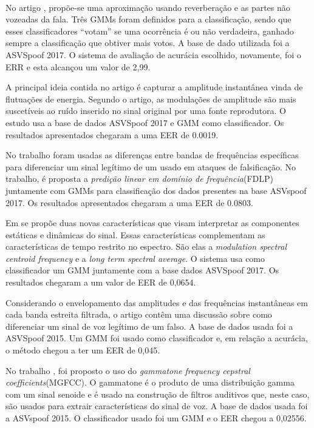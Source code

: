 \documentclass[a4paper,12pt,openright,oneside]{book}
\newenvironment{myenv}[1]
{\begin{spacing}{#1}}
	{\end{spacing}}
\begin{document}
\begin{myenv}{1.5}
\\
\par No artigo \cite{ISI:000490497200068}, propõe-se uma aproximação usando reverberação e as partes não vozeadas da fala. Três GMMs foram definidos para a classificação, sendo que esses classificadores ``votam'' se uma ocorrência é ou não verdadeira, ganhado sempre a classificação que obtiver mais votos. A base de dado utilizada foi a ASVSpoof 2017. O sistema de avaliação de acurácia escolhido, novamente, foi o ERR e esta alcançou um valor de 2,99.
\\
\par A principal ideia contida no artigo \cite{ISI:000465363900136} é capturar a amplitude instantânea vinda de flutuações de energia. Segundo o artigo, as modulações de amplitude são mais suscetíveis ao ruído inserido no sinal original por uma fonte reprodutora. O estudo usa a base de dados ASVSpoof 2017 e GMM como classificador. Os resultados apresentados chegaram a uma EER de 0.0019.
\\
\par No trabalho \cite{ISI:000465363900139} foram usadas as diferenças entre bandas de frequências específicas para diferenciar um sinal legítimo de um usado em ataques de falsificação. No trabalho, é proposta a \textit{predição linear em domínio de frequência}(FDLP) juntamente com GMMs para classificação dos dados presentes na base ASVspoof  2017. Os resultados apresentados chegaram a uma EER de 0.0803.
\\
\par Em \cite{Suthokumar2018} se propõe duas novas características que visam interpretar as componentes estáticas e dinâmicas do sinal. Essas características complementam as características de tempo restrito no espectro. São elas a \textit{modulation  spectral  centroid  frequency} e a \textit{long term spectral average}. O sistema usa como classificador um GMM juntamente com a base dados ASVSpoof 2017. Os resultados chegaram a um valor de EER de 0,0654.
\\
\par Considerando o envelopamento das amplitudes e das frequências instantâneas em cada banda estreita filtrada, o artigo \cite{ISI:000458728700054} contêm uma discussão sobre como diferenciar um sinal de voz legítimo de um falso. A base de dados usada foi a ASVSpoof 2015. Um GMM foi usado como classificador e, em relação a acurácia, o método chegou a ter um EER de 0,045.
\\
\par No trabalho \cite{ISI:000392503100008}, foi proposto o uso do \textit{gammatone frequency cepstral coefficients}(MGFCC). O gammatone é o produto de uma distribuição gamma com um sinal senoide e é usado na construção de filtros auditivos que, neste caso, são usados para extrair características do sinal de voz. A base de dados usada foi a ASVspoof 2015. O classificador usado foi um GMM e o EER chegou a 0,02556.

\end{myenv}
\end{document}
